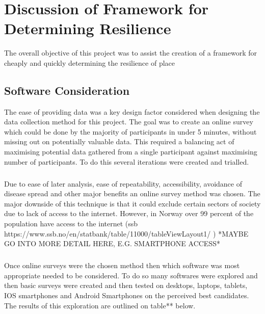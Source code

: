 \chapter{Discussion of Framework for Determining Resilience}
The overall objective of this project was to assist the creation of a framework for cheaply and quickly determining the resilience of place

\section{Software Consideration}

The ease of providing data was a key design factor considered when designing the data collection method for this project. The goal was to create an online survey which could be done by the majority of participants in under 5 minutes, without missing out on potentially valuable data. This required a balancing act of maximising potential data gathered from a single participant against maximising number of participants. To do this several iterations were created and trialled.
\paragraph{}
Due to ease of later analysis, ease of repeatability, accessibility,  avoidance of disease spread and other major benefits an online survey method was chosen. The major downside of this technique is that it could exclude certain sectors of society due to lack of access to the internet. However, in Norway over 99 percent of the population have access to the internet (ssb https://www.ssb.no/en/statbank/table/11000/tableViewLayout1/ ) *MAYBE GO INTO MORE DETAIL HERE, E.G. SMARTPHONE ACCESS*
\paragraph{}
Once online surveys were the chosen method then which software was most appropriate needed to be considered. To do so many softwares were explored and then basic surveys were created and then tested on desktops, laptops, tablets, IOS smartphones and Android Smartphones on the perceived best candidates. The results of this exploration are outlined on table** below.

